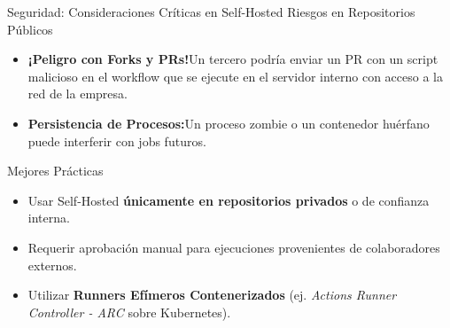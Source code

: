 \documentclass[aspectratio=169]{beamer}
\begin{document}
\contentSlideTwoCols
  {Seguridad: Consideraciones Críticas en Self-Hosted}
  {Riesgos en Repositorios Públicos}
  {
    \begin{itemize}
      \item \textbf{\color{cbOrange}¡Peligro con Forks y PRs!}\newline Un tercero podría enviar un PR con un script malicioso en el workflow que se ejecute en el servidor interno con acceso a la red de la empresa.
      \item \textbf{Persistencia de Procesos:}\newline Un proceso zombie o un contenedor huérfano puede interferir con jobs futuros.
    \end{itemize}
  }
  {Mejores Prácticas}
  {
    \begin{itemize}
      \item Usar Self-Hosted \textbf{únicamente en repositorios privados} o de confianza interna.
      \item Requerir aprobación manual para ejecuciones provenientes de colaboradores externos.
      \item Utilizar \textbf{Runners Efímeros Contenerizados} (ej. \textit{Actions Runner Controller - ARC} sobre Kubernetes).
    \end{itemize}
  }

\end{document}
